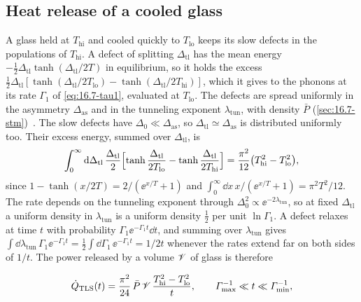 \subsection{Heat release of a cooled glass}\label{sec:16.8-heat}

A glass held at $T_{\mathrm{hi}}$ and cooled quickly to $T_{\mathrm{lo}}$ keeps its slow defects in the populations of $T_{\mathrm{hi}}$. A defect of splitting $\Delta_{\mathrm{tl}}$ has the mean energy $-\tfrac12\Delta_{\mathrm{tl}}\tanh(\Delta_{\mathrm{tl}}/2T)$ in equilibrium, so it holds the excess $\tfrac12\Delta_{\mathrm{tl}}[\tanh(\Delta_{\mathrm{tl}}/2T_{\mathrm{lo}}) - \tanh(\Delta_{\mathrm{tl}}/2T_{\mathrm{hi}})]$, which it gives to the phonons at its rate $\varGamma_1$ of \cref{eq:16.7-tau1}, evaluated at $T_{\mathrm{lo}}$. The defects are spread uniformly in the asymmetry $\Delta_{\mathrm{as}}$ and in the tunneling exponent $\lambda_{\mathrm{tun}}$, with density $\bar P$ (\cref{sec:16.7-stm})~\cite[Eq.~(1)]{sahling2010anomalous}. The slow defects have $\Delta_0 \ll \Delta_{\mathrm{as}}$, so $\Delta_{\mathrm{tl}} \simeq \Delta_{\mathrm{as}}$ is distributed uniformly too. Their excess energy, summed over $\Delta_{\mathrm{tl}}$, is
\begin{equation*}
  \int_0^\infty\mathrm{d}\Delta_{\mathrm{tl}}\,\frac{\Delta_{\mathrm{tl}}}{2}\Bigl[\tanh\frac{\Delta_{\mathrm{tl}}}{2T_{\mathrm{lo}}} - \tanh\frac{\Delta_{\mathrm{tl}}}{2T_{\mathrm{hi}}}\Bigr] = \frac{\pi^2}{12}\bigl(T_{\mathrm{hi}}^2 - T_{\mathrm{lo}}^2\bigr) ,
\end{equation*}
since $1 - \tanh(x/2T) = 2/(\ee^{x/T} + 1)$ and $\int_0^\infty\dd x\,x/(\ee^{x/T} + 1) = \pi^2T^2/12$. The rate depends on the tunneling exponent through $\Delta_0^2 \propto \ee^{-2\lambda_{\mathrm{tun}}}$, so at fixed $\Delta_{\mathrm{tl}}$ a uniform density in $\lambda_{\mathrm{tun}}$ is a uniform density $\tfrac12$ per unit $\ln\varGamma_1$. A defect relaxes at time $t$ with probability $\varGamma_1\ee^{-\varGamma_1t}\dd t$, and summing over $\lambda_{\mathrm{tun}}$ gives $\int\dd\lambda_{\mathrm{tun}}\,\varGamma_1\ee^{-\varGamma_1t} = \tfrac12\int\dd\varGamma_1\,\ee^{-\varGamma_1t} = 1/2t$ whenever the rates extend far on both sides of $1/t$. The power released by a volume $\mathscr{V}$ of glass is therefore
\begin{keyresult}
\begin{equation}
  \dot Q_{\mathrm{TLS}}(t) = \frac{\pi^2}{24}\,\bar P\,\mathscr{V}\,\frac{T_{\mathrm{hi}}^2 - T_{\mathrm{lo}}^2}{t} , \qquad \varGamma_{\max}^{-1} \ll t \ll \varGamma_{\min}^{-1} ,
  \label{eq:16.8-heat}
\end{equation}
\end{keyresult}
